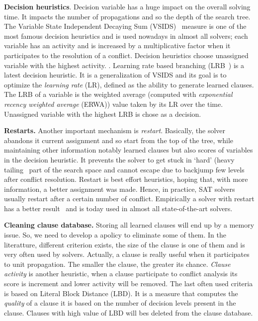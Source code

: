 \textbf{Decision heuristics}. Decision variable has a huge impact on the 
overall solving time. It impacts the number of propagations and so 
the depth of the search tree.
The Variable State Independent Decaying Sum (VSIDS)~\cite{moskewicz2001chaff} measure is one of the most famous decision heuristics and is used
nowadays in almost all solvers; each variable has an activity and  is increased by a multiplicative factor 
when it participates to the resolution of a conflict.
Decision heuristics choose unassigned variable with the highest activity.
. 
Learning rate based branching (LRB~\cite{liang2016learning}) is a latest decision heuristic. It is a
generalization of VSIDS and its goal is to optimize the \emph{learning rate} (LR), defined as the ability to generate
learned clauses. The LRB of a variable is the weighted average (computed with \emph{exponential recency
weighted average} (ERWA))  value taken by its LR over the time. Unassigned variable with the highest LRB is chose as a decision. 


\textbf{Restarts.}
Another important mechanism is \emph{restart}. Basically, the solver abandons it current assignment and so 
start from the top of the tree, while maintaining other information notably learned clauses but also scores of variables in the decision heuristic. 
It prevents the solver to get stuck in ‘hard’ (heavy tailing~\cite{gomes1997heavy} part of the search space and cannot escape due 
to backjump few levels after conflict resolution. Restart is best effort heuristics, hoping that,
with more information, a better assignment was made. Hence, in practice, SAT solvers usually restart after a
certain number of conflict. Empirically a solver with restart has a better result~\cite{huang2007effect} and is today
used in almost all state-of-the-art solvers.


\textbf{Cleaning clause database.}
Storing  all learned clauses will end up by a memory issue. So, we need to develop a apolicy to eliminate
some of them. In the literatture, different criterion exists,
 the size of the clause is one of them and is very often used by solvers. Actually, a clause is really useful when 
it participates to unit propagation. The smaller the clause, the greater its chance.
\emph{Clause activity} is another heuristic, when a clause participate to conflict analysis 
its score is increment and lower activity will be removed. The last often used criteria 
is based on Literal Block Distance (LBD). It is a measure that computes the \emph{quality} of a clause
it is based on the number of decision levels present in the clause. Clauses with high value of LBD will bes
deleted from the clause database.


